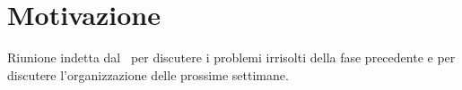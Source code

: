 \documentclass[../RiunioneInterna16-02-19.tex]{subfiles}
\begin{document}
\section{Motivazione}
Riunione indetta dal \responsabilediprogetto\ per discutere i problemi irrisolti della fase precedente e per discutere l'organizzazione delle prossime settimane.
\end{document}
